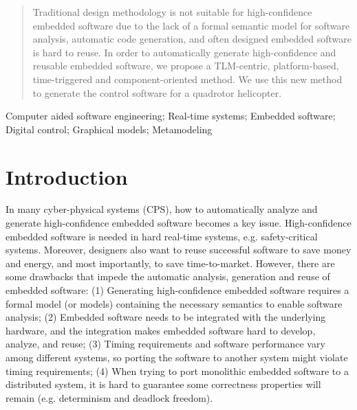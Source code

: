 \documentclass[10pt, conference, compsocconf]{IEEEtran}
\begin{document}
\begin{abstract}
Traditional design methodology is not suitable for high-confidence embedded software due to the lack of a formal semantic model for software analysis, automatic code generation, and often designed embedded software is hard to reuse. In order to automatically generate high-confidence and reusable embedded software, we propose a TLM-centric, platform-based, time-triggered and component-oriented method. We use this new method to generate the control software for a quadrotor helicopter.
\end{abstract} 

\begin{IEEEkeywords}
Computer aided software engineering; Real-time systems; Embedded software; Digital control; Graphical models; Metamodeling
\end{IEEEkeywords}


%
\IEEEpeerreviewmaketitle



\section{Introduction}

In many cyber-physical systems (CPS), how to automatically analyze and generate high-confidence embedded software becomes a key issue. High-confidence embedded software is needed in hard real-time systems, e.g. safety-critical systems. Moreover, designers also want to reuse successful software to save money and energy, and most importantly, to save time-to-market. However, there are some drawbacks that impede the automatic analysis, generation and reuse of embedded software: (1) Generating high-confidence embedded software requires a formal model (or models) containing the necessary semantics to enable software analysis; (2) Embedded software needs to be integrated with the underlying hardware, and the integration makes embedded software hard to develop, analyze, and reuse; (3) Timing requirements and software performance vary among different systems, so porting the software to another system might violate timing requirements; (4) When trying to port monolithic embedded software to a distributed system, it is hard to guarantee some correctness properties will remain (e.g. determinism and deadlock freedom).
\end{document}
